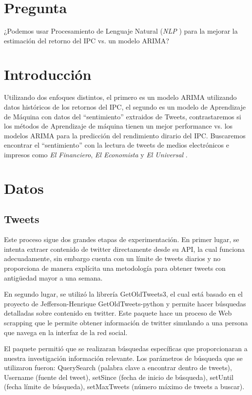 \documentclass[12pt,reqno,letter]{article}
\begin{document}
	    
	\begin{multicols}{2}
    \section{Pregunta}
    
    ¿Podemos usar Procesamiento de Lenguaje Natural (\textit{NLP} ) para la mejorar la estimación del retorno del IPC vs. un modelo ARIMA?
	    
        \section{Introducción}
		Utilizando dos enfoques distintos, el primero es un modelo ARIMA utilizando datos históricos de 
		los retornos del IPC, el segundo es un modelo de  Aprendizaje de Máquina con datos del
		``sentimiento'' extraidos de Tweets,
		contrastaremos si los métodos de Aprendizaje de máquina tienen un mejor performance
		vs. los modelos ARIMA para la predicción del rendimiento dirario del IPC.
		Buscaremos encontrar el ``sentimiento'' con la lectura de tweets de medios electr\'onicos e impresos como \textit{El Financiero}, \textit{El Economista} y \textit{El Universal} .
		
		\section{Datos}

        \subsection{Tweets}

        Este proceso sigue dos grandes etapas de experimentación. En primer lugar, se intenta extraer contenido de twitter directamente desde su API, la cual funciona adecuadamente, sin embargo cuenta con un límite de tweets diarios y no proporciona de manera explícita una metodología para obtener tweets con antigüedad mayor a una semana. 
        
        En segundo lugar, se utilizó la librería GetOldTweets3, el cual está basado en el proyecto de Jefferson-Henrique GetOldTweets-python y permite hacer búsquedas detalladas sobre contenido en twitter. Este paquete hace un proceso de Web scrapping que le permite obtener información de twitter simulando a una persona que navega en la interfaz de la red social. 
        
        El paquete permitió que se realizaran búsquedas específicas que proporcionaran a nuestra investigación información relevante. Los parámetros de búsqueda que se utilizaron fueron: QuerySearch (palabra clave a encontrar dentro de tweets), Username (fuente del tweet), setSince (fecha de inicio de búsqueda), setUntil (fecha límite de búsqueda), setMaxTweets (número máximo de tweets a buscar). 
        

\end{multicols}
\end{document}
